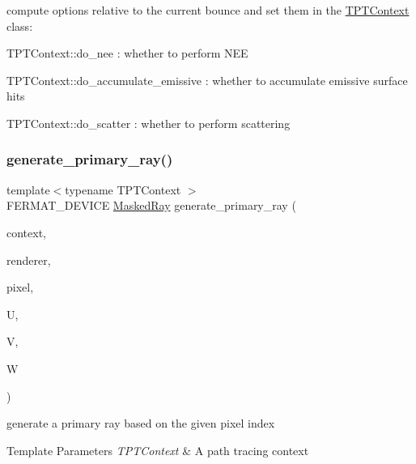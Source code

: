 compute options relative to the current bounce and set them in the \hyperlink{_p_t_lib_page_TPTContext}{T\+P\+T\+Context} class\+: \begin{DoxyParagraph}{}

\begin{DoxyItemize}
\item T\+P\+T\+Context\+::do\+\_\+nee \+: whether to perform N\+EE
\item T\+P\+T\+Context\+::do\+\_\+accumulate\+\_\+emissive \+: whether to accumulate emissive surface hits
\item T\+P\+T\+Context\+::do\+\_\+scatter \+: whether to perform scattering 
\end{DoxyItemize}
\end{DoxyParagraph}
\mbox{\label{group___p_t_lib_core_ga28fe33ab0663b2331fe607662ed07349}} 
\subsubsection{\texorpdfstring{generate\+\_\+primary\+\_\+ray()}{generate\_primary\_ray()}\hspace{0.1cm}{\footnotesize\ttfamily [1/2]}}
{\footnotesize\ttfamily template$<$typename T\+P\+T\+Context $>$ \\
F\+E\+R\+M\+A\+T\+\_\+\+D\+E\+V\+I\+CE \hyperlink{struct_masked_ray}{Masked\+Ray} generate\+\_\+primary\+\_\+ray (\begin{DoxyParamCaption}\item[{T\+P\+T\+Context \&}]{context,  }\item[{\hyperlink{struct_rendering_context_view}{Rendering\+Context\+View} \&}]{renderer,  }\item[{const uint2}]{pixel,  }\item[{\hyperlink{structcugar_1_1_vector}{cugar\+::\+Vector3f}}]{U,  }\item[{\hyperlink{structcugar_1_1_vector}{cugar\+::\+Vector3f}}]{V,  }\item[{\hyperlink{structcugar_1_1_vector}{cugar\+::\+Vector3f}}]{W }\end{DoxyParamCaption})}

generate a primary ray based on the given pixel index


\begin{DoxyTemplParams}{Template Parameters}
{\em T\+P\+T\+Context} & A path tracing context\\
\hline
\end{DoxyTemplParams}

